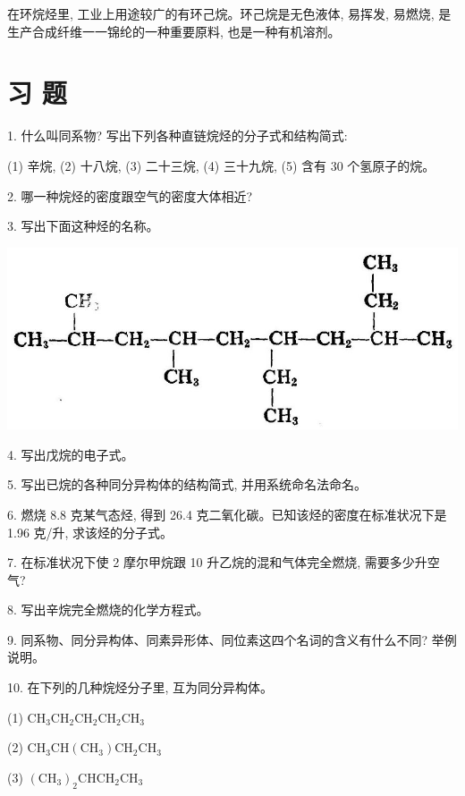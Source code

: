 \documentclass[10pt]{article}
\begin{document}
在环烷烃里, 工业上用途较广的有环己烷。环己烷是无色液体, 易挥发, 易燃烧, 是生产合成纤维一一锦纶的一种重要原料, 也是一种有机溶剂。

\section*{习 题}

1. 什么叫同系物? 写出下列各种直链烷烃的分子式和结构简式:

(1) 辛烷, (2) 十八烷, (3) 二十三烷, (4) 三十九烷, (5) 含有 30 个氢原子的烷。

2. 哪一种烷烃的密度跟空气的密度大体相近?

3. 写出下面这种烃的名称。

\begin{center}
\includegraphics[max width=1.0\textwidth]{images/01912d16-be99-77bb-9535-4f3ed8d9946f_66_539651.jpg}
\end{center}

4. 写出戊烷的电子式。

5. 写出已烷的各种同分异构体的结构简式, 并用系统命名法命名。

6. 燃烧 8.8 克某气态烃, 得到 26.4 克二氧化碳。已知该烃的密度在标准状况下是 1.96 克/升, 求该烃的分子式。

7. 在标准状况下使 2 摩尔甲烷跟 10 升乙烷的混和气体完全燃烧, 需要多少升空气?

8. 写出辛烷完全燃烧的化学方程式。

9. 同系物、同分异构体、同素异形体、同位素这四个名词的含义有什么不同? 举例说明。

10. 在下列的几种烷烃分子里, 互为同分异构体。

(1) \({\mathrm{{CH}}}_{3}{\mathrm{{CH}}}_{2}{\mathrm{{CH}}}_{2}{\mathrm{{CH}}}_{2}{\mathrm{{CH}}}_{3}\)

(2) \({\mathrm{{CH}}}_{3}\mathrm{{CH}}\left( {\mathrm{{CH}}}_{3}\right) {\mathrm{{CH}}}_{2}{\mathrm{{CH}}}_{3}\)

(3) \({\left( {\mathrm{{CH}}}_{3}\right) }_{2}{\mathrm{{CHCH}}}_{2}{\mathrm{{CH}}}_{3}\)
\end{document}
